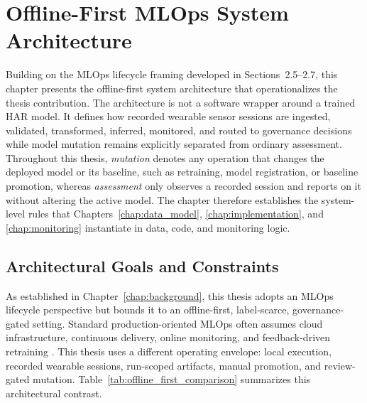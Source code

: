 \chapter{Offline-First MLOps System Architecture}
\label{chap:architecture}


Building on the MLOps lifecycle framing developed in Sections~2.5--2.7, this chapter presents the offline-first system architecture that operationalizes the thesis contribution. The architecture is not a software wrapper around a trained HAR model. It defines how recorded wearable sensor sessions are ingested, validated, transformed, inferred, monitored, and routed to governance decisions while model mutation remains explicitly separated from ordinary assessment. Throughout this thesis, \emph{mutation} denotes any operation that changes the deployed model or its baseline, such as retraining, model registration, or baseline promotion, whereas \emph{assessment} only observes a recorded session and reports on it without altering the active model. The chapter therefore establishes the system-level rules that Chapters~\ref{chap:data_model}, \ref{chap:implementation}, and \ref{chap:monitoring} instantiate in data, code, and monitoring logic.

\section{Architectural Goals and Constraints}
\label{sec:architecture_goals}

As established in Chapter~\ref{chap:background}, this thesis adopts an MLOps lifecycle perspective but bounds it to an offline-first, label-scarce, governance-gated setting. Standard production-oriented MLOps often assumes cloud infrastructure, continuous delivery, online monitoring, and feedback-driven retraining \cite{amershi2019mlops,kreuzberger2023mlops,paleyes2022challenges,hewage2022mlops}. This thesis uses a different operating envelope: local execution, recorded wearable sessions, run-scoped artifacts, manual promotion, and review-gated mutation. Table~\ref{tab:offline_first_comparison} summarizes this architectural contrast.

